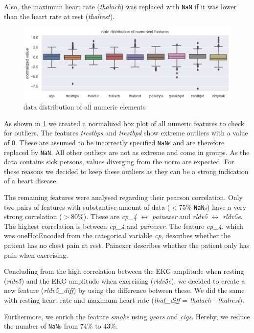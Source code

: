Also, the maximum heart rate (\emph{thalach}) was replaced with \texttt{NaN} if it was lower than the heart rate at rest (\emph{thalrest}).

\begin{figure}[h]
	\centering
	\includegraphics[width=\textwidth]{images/dataDistribution.png}
	\caption{data distribution of all numeric elements}
	\label{fig:dataDistribution}
\end{figure}
As shown in \cref{fig:dataDistribution} we created a normalized box plot of all numeric features to check for outliers. The features \emph{trestbps} and \emph{trestbpd} show extreme outliers with a value of 0. These are assumed to be incorrectly specified \texttt{NaN}s and are therefore replaced by \texttt{NaN}. All other outliers are not as extreme and come in groups. As the data contains sick persons, values diverging from the norm are expected. For these reasons we decided to keep these outliers as they can be a strong indication of a heart disease.

The remaining features were analysed regarding their pearson correlation. Only two pairs of features with substantive amount of data ($<$75\% \texttt{NaN}s) have a very strong correlation ($>$80\%).  
These are \emph{cp\_4} $\leftrightarrow$ \emph{painexer} and \emph{rldv5} $\leftrightarrow$ \emph{rldv5e}. The highest correlation is between \emph{cp\_4} and \emph{painexer}. The feature \emph{cp\_4}, which was oneHotEncoded from the categorical variable \emph{cp}, describes whether the patient has no chest pain at rest. Painexer describes whether the patient only has pain when exercising. 

Concluding from the high correlation between the EKG amplitude when resting (\emph{rldv5}) and the EKG amplitude when exercising (\emph{rldv5e}), we decided to create a new feature (\emph{rldv5\_diff}) by using the difference between these. We did the same with resting heart rate and maximum heart rate (\emph{thal\_diff} = \emph{thalach} - \emph{thalrest}). 

Furthermore, we enrich the feature \emph{smoke} using \emph{years} and \emph{cigs}. Hereby, we reduce the number of \texttt{NaN}s from 74\% to 43\%. 

